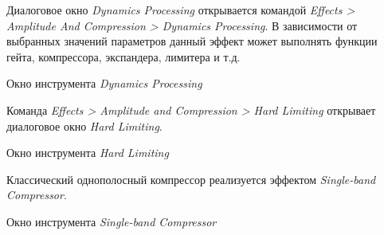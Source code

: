 \documentclass{beamer}
\begin{document}
\begin{frame}
  Диалоговое окно \emph{Dynamics Processing} открывается командой \emph{Effects > Amplitude And Compression > Dynamics Processing}. В зависимости от выбранных значений параметров данный эффект может выполнять функции гейта, компрессора, экспандера, лимитера и т.д.

  \begin{block} {Окно инструмента \emph{Dynamics Processing}}
  \end{block}
\end{frame}

\begin{frame}
  Команда \emph{Effects > Amplitude and Compression > Hard Limiting} открывает диалоговое окно \emph{Hard Limiting}.

  \begin{block} {Окно инструмента \emph{Hard Limiting}}
  \end{block}
\end{frame}

\begin{frame}
  Классический однополосный компрессор реализуется эффектом \emph{Single-band Compressor}.

  \begin{block}{Окно инструмента \emph{Single-band Compressor}}
  \end{block}
\end{frame}
\end{document}
